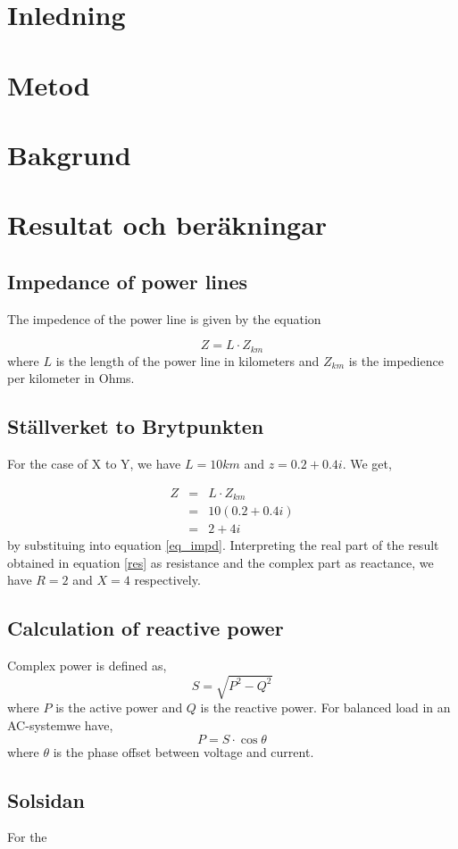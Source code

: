\documentclass{report}
\title{}
\date{\today}
\author{Johanna Sörbom}
\newcommand{\case}[1]{\subsection*{#1}}
\newcommand{\ac}{AC-system}
\newcommand{\cmp}[2]{\ensuremath{#1+#2i}}
\begin{document}
\maketitle
\section{Inledning}
\section{Metod}
\section{Bakgrund}
\section{Resultat och beräkningar}
\subsection{Impedance of power lines}
The impedence of the power line is given by the equation 

\begin{equation}\label{eq_impd}
Z =  L \cdot Z_{km}
\end{equation} where $L$ is the length of the power line in kilometers and $Z_{km}$ is the impedience per kilometer in Ohms.

\case{Ställverket to Brytpunkten}
For the case of X to Y, we have $L=10km$ and $z=\cmp{0.2}{0.4}$.  We get,

\begin{eqnarray}
Z&=&  L \cdot Z_{km} \\
&=&10 (\cmp{0.2}{0.4}) \\
&=& \cmp{2}{4} \label{res}
\end{eqnarray} by substituing into equation \ref{eq_impd}. Interpreting the real part of the result obtained in equation \ref{res} as resistance and the complex part as reactance, we have $R=2$ and $X=4$ respectively.

\subsection{Calculation of reactive power}
Complex power is defined as, \begin{equation}
S = \sqrt{P^2 - Q^2}
\end{equation}
where $P$ is the active power and $Q$ is the reactive power. For balanced load in an \ac we have, 
\begin{equation}
P = S \cdot \cos\theta
\end{equation}
where $\theta$ is the phase offset between voltage and current. 
\case{Solsidan}
For the 
\end{document}
